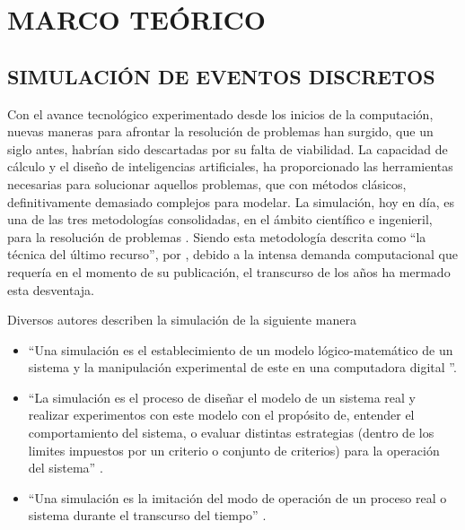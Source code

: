 
\section{MARCO TEÓRICO}

\subsection{SIMULACIÓN DE EVENTOS DISCRETOS}

Con el avance tecnológico experimentado desde los inicios de la computación,
nuevas maneras para afrontar la resolución de problemas han surgido,
que un siglo antes, habrían sido descartadas por su falta de viabilidad.
La capacidad de cálculo y el diseño de inteligencias artificiales,
ha proporcionado las herramientas necesarias
para solucionar aquellos problemas, que con métodos clásicos,
definitivamente demasiado complejos para modelar.
La simulación, hoy en día, es una de las tres metodologías consolidadas,
en el ámbito científico e ingenieril,
para la resolución de problemas \citep{banks1998handbook}.
Siendo esta metodología descrita como ``la técnica del último recurso'',
por \citet{garzia1986discrete},
debido a la intensa demanda computacional
que requería en el momento de su publicación,
el transcurso de los años ha mermado esta desventaja.

Diversos autores describen la simulación de la siguiente manera

\begin{itemize}
	\item ``Una simulación es
	el establecimiento de un modelo lógico-matemático de un sistema
	y la manipulación experimental de este en una computadora digital
	\citep{pritsker1974gasp}''.   
	\item ``La simulación es el proceso de diseñar
		el modelo de un sistema real y realizar experimentos
		con este modelo con el propósito de,
		entender el comportamiento del sistema,
		o evaluar distintas estrategias
		(dentro de los limites impuestos por un criterio
		o conjunto de criterios)
		para la operación del sistema'' \citep{shannon1976systems}.
	\item ``Una simulación es la imitación del modo de operación
		de un proceso real o sistema durante el transcurso del tiempo''
		\citep{banks1999introduction}.
\end{itemize}

